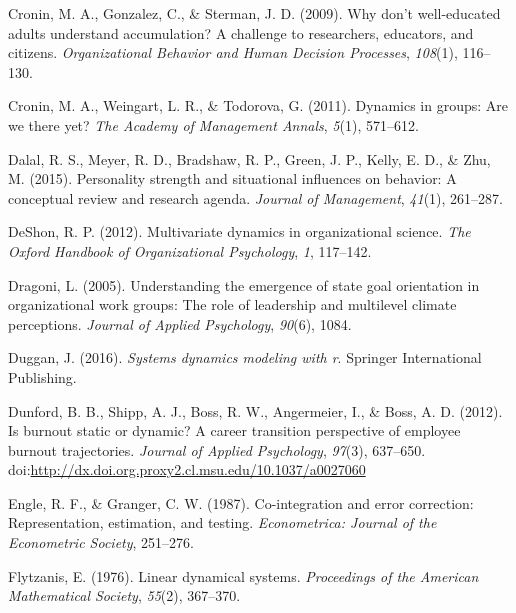 \documentclass[english,,man]{apa6}
\theoremstyle{definition}
\theoremstyle{definition}
\theoremstyle{definition}
\theoremstyle{remark}
\begin{document}
\leavevmode\hypertarget{ref-cronin2009don}{}%
Cronin, M. A., Gonzalez, C., \& Sterman, J. D. (2009). Why don't
well-educated adults understand accumulation? A challenge to
researchers, educators, and citizens. \emph{Organizational Behavior and
Human Decision Processes}, \emph{108}(1), 116--130.

\leavevmode\hypertarget{ref-cronin_dynamics_2011}{}%
Cronin, M. A., Weingart, L. R., \& Todorova, G. (2011). Dynamics in
groups: Are we there yet? \emph{The Academy of Management Annals},
\emph{5}(1), 571--612.

\leavevmode\hypertarget{ref-dalal2015personality}{}%
Dalal, R. S., Meyer, R. D., Bradshaw, R. P., Green, J. P., Kelly, E. D.,
\& Zhu, M. (2015). Personality strength and situational influences on
behavior: A conceptual review and research agenda. \emph{Journal of
Management}, \emph{41}(1), 261--287.

\leavevmode\hypertarget{ref-deshon_multivariate_2012}{}%
DeShon, R. P. (2012). Multivariate dynamics in organizational science.
\emph{The Oxford Handbook of Organizational Psychology}, \emph{1},
117--142.

\leavevmode\hypertarget{ref-dragoni2005understanding}{}%
Dragoni, L. (2005). Understanding the emergence of state goal
orientation in organizational work groups: The role of leadership and
multilevel climate perceptions. \emph{Journal of Applied Psychology},
\emph{90}(6), 1084.

\leavevmode\hypertarget{ref-duggan_systems}{}%
Duggan, J. (2016). \emph{Systems dynamics modeling with r}. Springer
International Publishing.

\leavevmode\hypertarget{ref-dunford_is_2012}{}%
Dunford, B. B., Shipp, A. J., Boss, R. W., Angermeier, I., \& Boss, A.
D. (2012). Is burnout static or dynamic? A career transition perspective
of employee burnout trajectories. \emph{Journal of Applied Psychology},
\emph{97}(3), 637--650.
doi:\href{https://doi.org/http://dx.doi.org.proxy2.cl.msu.edu/10.1037/a0027060}{http://dx.doi.org.proxy2.cl.msu.edu/10.1037/a0027060}

\leavevmode\hypertarget{ref-engle_co-integration_1987}{}%
Engle, R. F., \& Granger, C. W. (1987). Co-integration and error
correction: Representation, estimation, and testing. \emph{Econometrica:
Journal of the Econometric Society}, 251--276.

\leavevmode\hypertarget{ref-flytzanis1976linear}{}%
Flytzanis, E. (1976). Linear dynamical systems. \emph{Proceedings of the
American Mathematical Society}, \emph{55}(2), 367--370.
\end{document}
